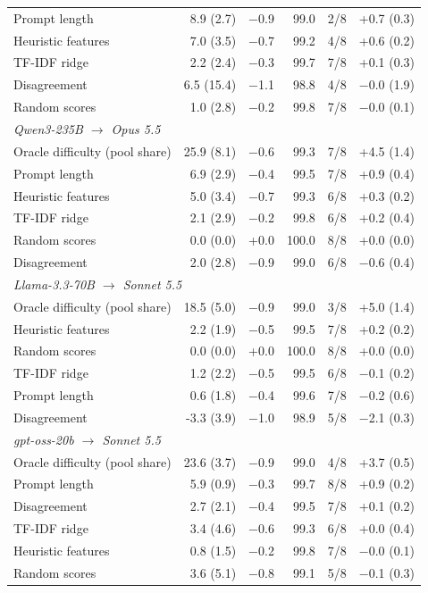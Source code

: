 \begin{longtable}{lrrrrr}
Prompt length & 8.9 (2.7) & $-$0.9 & 99.0 & 2/8 & +0.7 (0.3) \\
Heuristic features & 7.0 (3.5) & $-$0.7 & 99.2 & 4/8 & +0.6 (0.2) \\
TF-IDF ridge & 2.2 (2.4) & $-$0.3 & 99.7 & 7/8 & +0.1 (0.3) \\
Disagreement & 6.5 (15.4) & $-$1.1 & 98.8 & 4/8 & $-$0.0 (1.9) \\
Random scores & 1.0 (2.8) & $-$0.2 & 99.8 & 7/8 & $-$0.0 (0.1) \\
\midrule
\multicolumn{6}{l}{\emph{Qwen3-235B $\to$ Opus 5.5}} \\
Oracle difficulty (pool share) & 25.9 (8.1) & $-$0.6 & 99.3 & 7/8 & +4.5 (1.4) \\
Prompt length & 6.9 (2.9) & $-$0.4 & 99.5 & 7/8 & +0.9 (0.4) \\
Heuristic features & 5.0 (3.4) & $-$0.7 & 99.3 & 6/8 & +0.3 (0.2) \\
TF-IDF ridge & 2.1 (2.9) & $-$0.2 & 99.8 & 6/8 & +0.2 (0.4) \\
Random scores & 0.0 (0.0) & +0.0 & 100.0 & 8/8 & +0.0 (0.0) \\
Disagreement & 2.0 (2.8) & $-$0.9 & 99.0 & 6/8 & $-$0.6 (0.4) \\
\midrule
\multicolumn{6}{l}{\emph{Llama-3.3-70B $\to$ Sonnet 5.5}} \\
Oracle difficulty (pool share) & 18.5 (5.0) & $-$0.9 & 99.0 & 3/8 & +5.0 (1.4) \\
Heuristic features & 2.2 (1.9) & $-$0.5 & 99.5 & 7/8 & +0.2 (0.2) \\
Random scores & 0.0 (0.0) & +0.0 & 100.0 & 8/8 & +0.0 (0.0) \\
TF-IDF ridge & 1.2 (2.2) & $-$0.5 & 99.5 & 6/8 & $-$0.1 (0.2) \\
Prompt length & 0.6 (1.8) & $-$0.4 & 99.6 & 7/8 & $-$0.2 (0.6) \\
Disagreement & -3.3 (3.9) & $-$1.0 & 98.9 & 5/8 & $-$2.1 (0.3) \\
\midrule
\multicolumn{6}{l}{\emph{gpt-oss-20b $\to$ Sonnet 5.5}} \\
Oracle difficulty (pool share) & 23.6 (3.7) & $-$0.9 & 99.0 & 4/8 & +3.7 (0.5) \\
Prompt length & 5.9 (0.9) & $-$0.3 & 99.7 & 8/8 & +0.9 (0.2) \\
Disagreement & 2.7 (2.1) & $-$0.4 & 99.5 & 7/8 & +0.1 (0.2) \\
TF-IDF ridge & 3.4 (4.6) & $-$0.6 & 99.3 & 6/8 & +0.0 (0.4) \\
Heuristic features & 0.8 (1.5) & $-$0.2 & 99.8 & 7/8 & $-$0.0 (0.1) \\
Random scores & 3.6 (5.1) & $-$0.8 & 99.1 & 5/8 & $-$0.1 (0.3) \\
\bottomrule
\end{longtable}

